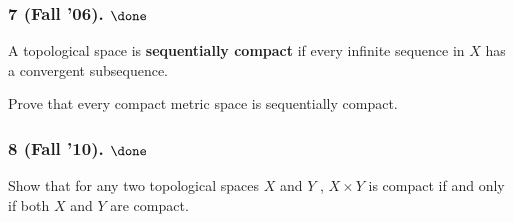 \hypertarget{fall-06.-done}{%
\subsubsection{\texorpdfstring{7 (Fall '06).
\(\done\)}{7 (Fall '06). \textbackslash done}}\label{fall-06.-done}}

\begin{problem}[Fall 2006, 7]

A topological space is \textbf{sequentially compact} if every infinite
sequence in \(X\) has a convergent subsequence.

Prove that every compact metric space is sequentially compact.

\end{problem}

\hypertarget{fall-10.-done}{%
\subsubsection{\texorpdfstring{8 (Fall '10).
\(\done\)}{8 (Fall '10). \textbackslash done}}\label{fall-10.-done}}

\begin{problem}[Fall 2010, 8]

Show that for any two topological spaces \(X\) and \(Y\) ,
\(X \times Y\) is compact if and only if both \(X\) and \(Y\) are
compact.

\end{problem}

